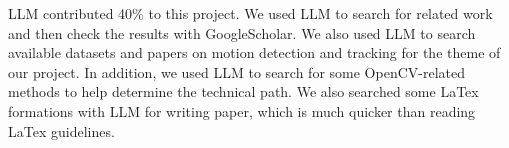 LLM contributed 40\% to this project. We used LLM to search for related work and then check the results with GoogleScholar. We also used LLM to search available datasets and papers on motion detection and tracking for the theme of our project. In addition, we used LLM to search for some OpenCV-related methods to help determine the technical path. We also searched some LaTex formations with LLM for writing paper, which is much quicker than reading LaTex guidelines.